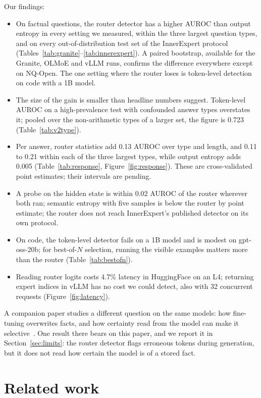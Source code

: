 \documentclass[11pt]{article}
\begin{document}
Our findings:
\begin{itemize}
  \item On factual questions, the router detector has a higher AUROC than output entropy in every setting we measured, within the three largest question types, and on every out-of-distribution test set of the InnerExpert protocol (Tables~\ref{tab:granite}--\ref{tab:innerexpert}). A paired bootstrap, available for the Granite, OLMoE and vLLM runs, confirms the difference everywhere except on NQ-Open. The one setting where the router loses is token-level detection on code with a 1B model.
  \item The size of the gain is smaller than headline numbers suggest. Token-level AUROC on a high-prevalence test with confounded answer types overstates it; pooled over the non-arithmetic types of a larger set, the figure is 0.723 (Table~\ref{tab:v2type}).
  \item Per answer, router statistics add 0.13 AUROC over type and length, and 0.11 to 0.21 within each of the three largest types, while output entropy adds 0.005 (Table~\ref{tab:response}, Figure~\ref{fig:response}). These are cross-validated point estimates; their intervals are pending.
  \item A probe on the hidden state is within 0.02 AUROC of the router wherever both ran; semantic entropy with five samples is below the router by point estimate; the router does not reach InnerExpert's published detector on its own protocol.
  \item On code, the token-level detector fails on a 1B model and is modest on gpt-oss-20b; for best-of-$N$ selection, running the visible examples matters more than the router (Table~\ref{tab:bestofn}).
  \item Reading router logits costs 4.7\% latency in HuggingFace on an L4; returning expert indices in vLLM has no cost we could detect, also with 32 concurrent requests (Figure~\ref{fig:latency}).
\end{itemize}

A companion paper studies a different question on the same models: how fine-tuning overwrites facts, and how certainty read from the model can make it selective~\citep{companion2026forgetting}.
One result there bears on this paper, and we report it in Section~\ref{sec:limits}: the router detector flags erroneous tokens during generation, but it does not read how certain the model is of a stored fact.

\section{Related work}
\label{sec:related}
\end{document}
